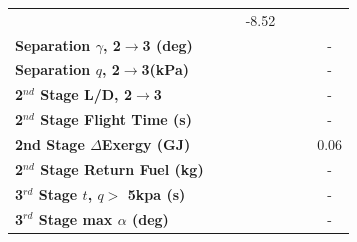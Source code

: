 \begin{table}[ht]
\begin{tabular}{l c c c c c c}
	& \secondthirdSeparationvmSPARTANOneHundredTwoFive
	& \secondthirdSeparationvmSPARTANOneHundredFive
	&-8.52
	\\
	\textbf{Separation $\gamma$, 2$\rightarrow$3 (deg)}
	& \secondthirdSeparationgammamSPARTANNinetyFive
	& \secondthirdSeparationgammamSPARTANNinetySevenFive
	& \secondthirdSeparationgammamSPARTANStandard
	& \secondthirdSeparationgammamSPARTANOneHundredTwoFive
	& \secondthirdSeparationgammamSPARTANOneHundredFive
	& -
	\\
	\textbf{Separation $q$, 2$\rightarrow$3(kPa)}
	& \secondthirdSeparationqmSPARTANNinetyFive
	& \secondthirdSeparationqmSPARTANNinetySevenFive
	& \secondthirdSeparationqmSPARTANStandard
	& \secondthirdSeparationqmSPARTANOneHundredTwoFive
	& \secondthirdSeparationqmSPARTANOneHundredFive
	& -
	\\
	\textbf{2$^{nd}$ Stage L/D, 2$\rightarrow$3}
	& \secondthirdSeparationLDmSPARTANNinetyFive
	& \secondthirdSeparationLDmSPARTANNinetySevenFive
	& \secondthirdSeparationLDmSPARTANStandard
	& \secondthirdSeparationLDmSPARTANOneHundredTwoFive
	& \secondthirdSeparationLDmSPARTANOneHundredFive
	& -
	\\
	\textbf{2$^{nd}$ Stage Flight Time (s)}
	& \secondFlightTimemSPARTANNinetyFive
	& \secondFlightTimemSPARTANNinetySevenFive
	& \secondFlightTimemSPARTANStandard
	& \secondFlightTimemSPARTANOneHundredTwoFive
	& \secondFlightTimemSPARTANOneHundredFive
	& -
	\\
	\textbf{2nd Stage $\Delta$Exergy (GJ)}
	& \seconddExergymSPARTANNinetyFive
	& \seconddExergymSPARTANNinetySevenFive
	& \seconddExergymSPARTANStandard
	& \seconddExergymSPARTANOneHundredTwoFive
	& \seconddExergymSPARTANOneHundredFive
	&0.06
	\\
	\textbf{2$^{nd}$ Stage Return Fuel (kg)}
	& \returnFuelmSPARTANNinetyFive
	& \returnFuelmSPARTANNinetySevenFive
	& \returnFuelmSPARTANStandard
	& \returnFuelmSPARTANOneHundredTwoFive
	& \returnFuelmSPARTANOneHundredFive
	& -
	\\
	\textbf{3$^{rd}$ Stage $t$, $q >$ 5kpa (s)}
	& \thirdqOverFivemSPARTANNinetyFive
	& \thirdqOverFivemSPARTANNinetySevenFive
	& \thirdqOverFivemSPARTANStandard
	& \thirdqOverFivemSPARTANOneHundredTwoFive
	& \thirdqOverFivemSPARTANOneHundredFive
	& -
	\\
	\textbf{3$^{rd}$ Stage max $\alpha$ (deg)}
	& \thirdmaxAoAmSPARTANNinetyFive
	& \thirdmaxAoAmSPARTANNinetySevenFive
	& \thirdmaxAoAmSPARTANStandard
	& \thirdmaxAoAmSPARTANOneHundredTwoFive
	& \thirdmaxAoAmSPARTANOneHundredFive
	& -
	\\

\end{tabular}
\end{table}
